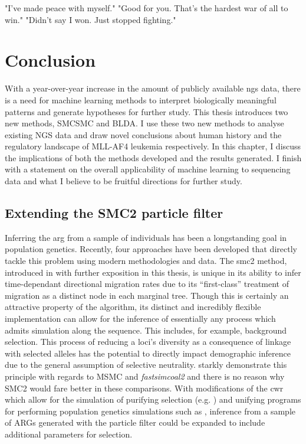 \begin{savequote}[8cm]

	"I've made peace with myself."\newline
	"Good for you. That's the hardest war of all to win."\newline
	"Didn't say I won. Just stopped fighting."\newline
\end{savequote}

\chapter{Conclusion}

With a year-over-year increase in the amount of publicly available \gls{ngs} data, there is a need for machine learning methods to interpret biologically meaningful patterns and generate hypotheses for further study. This thesis introduces two new methods, SMCSMC and BLDA. I use these two new methods to analyse existing NGS data and draw novel conclusions about human history and the regulatory landscape of MLL-AF4 leukemia respectively. In this chapter, I discuss the implications of both the methods developed and the results generated. I finish with a statement on the overall applicability of machine learning to sequencing data and what I believe to be fruitful directions for further study.  

\section{Extending the SMC2 particle filter}

Inferring the \gls{arg} from a sample of individuals has been a longstanding goal in population genetics. Recently, four approaches have been developed that directly tackle this problem using modern methodologies and data. The \gls{smc2} method, introduced in \textcite{10.1371/journal.pone.0247647} with further exposition in this thesis, is unique in its ability to infer time-dependant directional migration rates due to its ``first-class'' treatment of migration as a distinct node in each marginal tree. Though this is certainly an attractive property of the algorithm, its distinct and incredibly flexible implementation can allow for the inference of essentially any process which admits simulation along the sequence. This includes, for example, background selection. This process of reducing a loci's diversity as a consequence of linkage with selected alleles has the potential to directly impact demographic inference due to the general assumption of selective neutrality. \textcite{Johri2021} starkly demonstrate this principle with regards to MSMC and \textit{fastsimcoal2} and there is no reason why SMC2 would fare better in these comparisons. With modifications of the \gls{cwr} which allow for the simulation of purifying selection (e.g. \cite{Zeng2012}) and unifying programs for performing population genetics simulations such as \textcite{Adrion2020a}, inference from a sample of ARGs generated with the particle filter could be expanded to include additional parameters for selection. 

